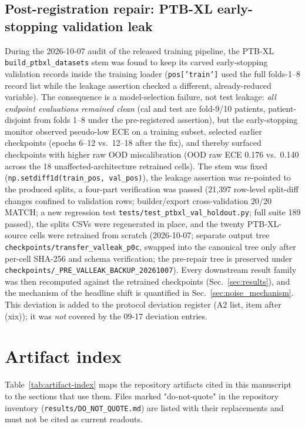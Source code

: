\documentclass[final,5p,times,nonatbib]{elsarticle}
\begin{document}
\subsection{Post-registration repair: PTB-XL early-stopping validation leak}
\label{sec:repair}
During the 2026-10-07 audit of the released training pipeline, the PTB-XL
\texttt{build\_ptbxl\_datasets} stem was found to keep its carved
early-stopping validation records inside the training loader
(\texttt{pos['train']} used the full folds-1--8 record list while the
leakage assertion checked a different, already-reduced variable). The
consequence is a model-selection failure, not test leakage: \emph{all
endpoint evaluations remained clean} (cal and test are fold-9/10 patients,
patient-disjoint from folds 1--8 under the pre-registered assertion), but
the early-stopping monitor observed pseudo-low ECE on a training subset,
selected earlier checkpoints (epochs 6--12 vs.\ 12--18 after the fix),
and thereby surfaced checkpoints with higher raw OOD miscalibration
(OOD raw ECE 0.176 vs.\ 0.140 across the 18 unaffected-architecture
retrained cells). The stem was fixed
(\texttt{np.setdiff1d(train\_pos, val\_pos)}), the leakage assertion was
re-pointed to the produced splits, a four-part verification was passed
(21{,}397 row-level split-diff changes confined to validation rows;
builder/export cross-validation 20/20 MATCH; a new regression test
\texttt{tests/test\_ptbxl\_val\_holdout.py}; full suite 189 passed), the
splits CSVs were regenerated in place, and the twenty PTB-XL-source cells
were retrained from scratch (2026-10-07; separate output tree
\texttt{checkpoints/transfer\_valleak\_p0c}, swapped into the canonical
tree only after per-cell SHA-256 and schema verification; the pre-repair
tree is preserved under
\texttt{checkpoints/\_PRE\_VALLEAK\_BACKUP\_20261007}). Every downstream
result family was then recomputed against the retrained checkpoints
(Sec.~\ref{sec:results}), and the mechanism of the headline shift is
quantified in Sec.~\ref{sec:noise_mechanism}. This
deviation is added to the protocol deviation register (A2 list, item
after (xix)); it was \emph{not} covered by the 09-17 deviation entries.


\section{Artifact index}
\label{app:artifact-index}
\setcounter{table}{0}

Table~\ref{tab:artifact-index} maps the repository artifacts cited
in this manuscript to the sections that use them. Files marked
"do-not-quote" in the repository inventory
(\texttt{results/DO\_NOT\_QUOTE.md}) are listed with their
replacements and must not be cited as current readouts.
\end{document}
